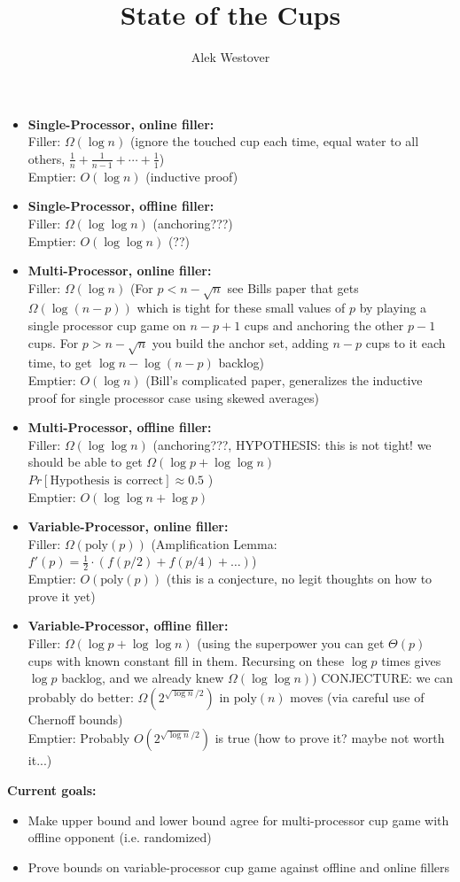 \documentclass{article}[11pt]
\author{Alek Westover}
\title{State of the Cups}
\begin{document}
\maketitle

\begin{itemize}
  \item \textbf{Single-Processor, online filler: } \\
    Filler: $\Omega(\log n)$ (ignore the touched cup each time, equal water to all others, $\frac{1}{n}+\frac{1}{n-1}  + \cdots + \frac{1}{1}$)\\
    Emptier: $O(\log n)$ (inductive proof)
  \item \textbf{Single-Processor, offline filler: } \\
    Filler: $\Omega(\log\log n)$ (anchoring???) \\
    Emptier: $O(\log\log n)$ (??)
  \item \textbf{Multi-Processor, online filler: } \\
    Filler: $\Omega(\log n)$ (For $p < n-\sqrt{n}$ see Bills paper that gets $\Omega(\log (n-p))$ which is tight for these small values of $p$ by playing a single processor cup game on $n-p+1$ cups and anchoring the other $p-1$ cups. For $p>n-\sqrt{n}$ you build the anchor set, adding $n-p$ cups to it each time, to get $\log n - \log (n-p)$ backlog)\\
    Emptier: $O(\log n)$ (Bill's complicated paper, generalizes the inductive proof for single processor case using skewed averages)
  \item \textbf{Multi-Processor, offline filler: } \\
    Filler: $\Omega(\log\log n)$ (anchoring???, HYPOTHESIS: this is not tight! we should be able to get $\Omega(\log p + \log \log n)$ $Pr[\text{Hypothesis is correct}] \approx 0.5$ ) \\
    Emptier: $O(\log\log n + \log p)$  
  \item \textbf{Variable-Processor, online filler: } \\
    Filler: $\Omega(\text{poly}(p))$ (Amplification Lemma: $f'(p) = \frac{1}{2}\cdot(f(p/2) + f(p/4) + \ldots)$) \\
    Emptier: $O(\text{poly}(p))$ (this is a conjecture, no legit thoughts on how to prove it yet)
  \item \textbf{Variable-Processor, offline filler: } \\
    Filler: $\Omega(\log p + \log \log n)$ (using the superpower you can get $\Theta(p)$ cups with known constant fill in them. Recursing on these $\log p$ times gives $\log p$ backlog, and we already knew $\Omega(\log\log n)$) CONJECTURE: we can probably do better: $\Omega(2^{\sqrt{\log n} /2})$ in $\text{poly}(n)$ moves (via careful use of Chernoff bounds)\\
    Emptier: Probably $O(2^{\sqrt{\log n} /2})$ is true (how to prove it? maybe not worth it...)
  
\end{itemize}

\textbf{Current goals:}
\begin{itemize}
  \item Make upper bound and lower bound agree for multi-processor cup game with offline opponent (i.e. randomized)
  \item Prove bounds on variable-processor cup game against offline and online fillers
\end{itemize}
\end{document}
